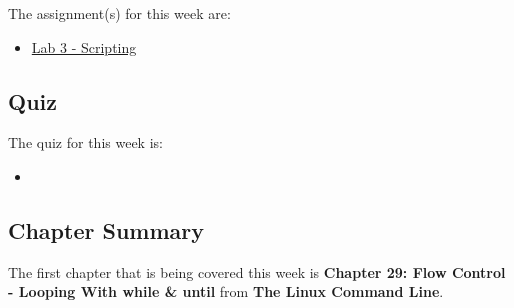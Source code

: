 The assignment(s) for this week are:

\begin{itemize}
    \item \href{https://github.com/cu-cspb-3308-software-dev-summer-2024/lab-3-QuantumCompiler}{Lab 3 - Scripting}
\end{itemize}

\subsection{Quiz}

The quiz for this week is:

\begin{itemize}
    \item {}
\end{itemize}

\subsection{Chapter Summary}

The first chapter that is being covered this week is \textbf{Chapter 29: Flow Control - Looping With while \& until} from \textbf{The Linux Command Line}.

